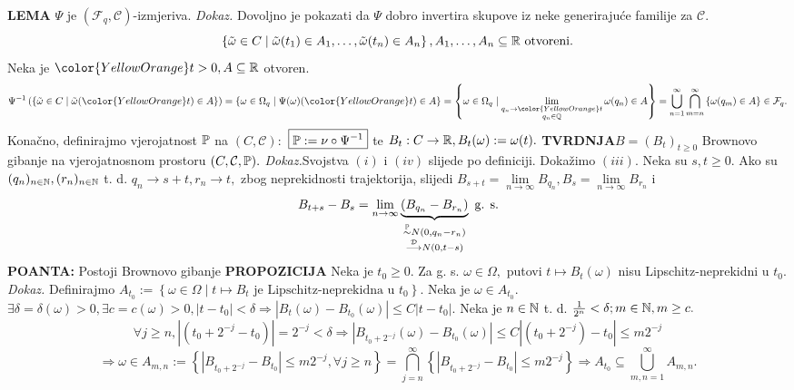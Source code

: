 \documentclass{article}
\begin{document}
\textbf{LEMA}\newline
\(\Psi\) je \((\mathcal F_q,\mathcal C)\)-izmjeriva.\newline\newline
\textit{Dokaz.}\newline
Dovoljno je pokazati da \(\Psi\) dobro invertira skupove iz neke generirajuće familije za \(\mathcal C.\) \[\left\{\tilde\omega\in C\mid\tilde\omega(t_1)\in A_1,\ldots,\tilde\omega(t_n)\in A_n\right\},A_1,\ldots,A_n\subseteq\Bbb R\text{ otvoreni}.\] Neka je \({\color{YellowOrange}t}>0,A\subseteq\Bbb R\) otvoren. \[\Psi^{-1}\left(\left\{\tilde\omega\in C\mid\tilde\omega({\color{YellowOrange}t})\in A\right\}\right)=\left\{\omega\in\Omega_q\mid \Psi(\omega)({\color{YellowOrange}t})\in A\right\}=\left\{\omega\in\Omega_q\mid\lim\limits_{\substack{q_n\to {\color{YellowOrange}t}\\q_n\in\Bbb Q}}\omega(q_n)\in A\right\}=\bigcup_{n=1}^\infty\bigcap_{m=n}^\infty\left\{\omega(q_m)\in A\right\}\in\mathcal F_q.\]
Konačno, definirajmo vjerojatnost \(\Bbb P\) na \((C,\mathcal C):\) \(\boxed{\Bbb P:=\nu\circ\Psi^{-1}}\) te \(B_t:C\to\Bbb R,B_t(\omega):=\omega(t).\)\newline 
\textbf{TVRDNJA}\newline \(B=(B_t)_{t\ge0}\) Brownovo gibanje na vjerojatnosnom prostoru \((C,\mathcal C,\Bbb P).\)\newline\newline
\textit{Dokaz.}\newline Svojstva \((i)\) i \((iv)\) slijede po definiciji. Dokažimo \((iii).\) Neka su \(s,t\ge0.\) Ako su \((q_n)_{n\in\Bbb N},(r_n)_{n\in\Bbb N}\) t. d. \(q_n\to s+t,r_n\to t,\) zbog neprekidnosti trajektorija, slijedi \(B_{s+t}=\lim\limits_{n\to\infty}B_{q_n},B_s=\lim\limits_{n\to\infty}B_{r_n}\) i \[B_{t+s}-B_s=\lim_{n\to\infty}\underbrace{(B_{q_n}-B_{r_n})}_{\substack{\overset{\Bbb P}{\sim}N\left(0,q_n-r_n\right)\\\overset{\mathcal D}{\longrightarrow}N(0,t-s)}}\text{ g. s.}\]
\textbf{POANTA:} Postoji Brownovo gibanje \newline\newline
\textbf{PROPOZICIJA}\newline
Neka je \(t_0\ge0.\) Za g. s. \(\omega\in\Omega,\) putovi \(t\mapsto B_t(\omega)\) nisu Lipschitz-neprekidni u \(t_0.\)\newline\newline
\textit{Dokaz.}\newline
Definirajmo \(A_{t_0}:=\left\{\omega\in\Omega\mid t\mapsto B_t\text{ je Lipschitz-neprekidna u }t_0\right\}.\) Neka je \(\omega\in A_{t_0}.\) \(\exists\delta=\delta(\omega)>0,\exists c=c(\omega)>0,|t-t_0|<\delta\Rightarrow\left|B_t(\omega)-B_{t_0}(\omega)\right|\le C|t-t_0|.\) Neka je \(n\in\Bbb N\) t. d. \(\frac1{2^n}<\delta;m\in\Bbb N,m\ge c.\) \[\forall j\ge n,\left|\left(t_0+2^{-j}-t_0\right)\right|=2^{-j}<\delta\Rightarrow\left|B_{t_0+2^{-j}}(\omega)-B_{t_0}(\omega)\right|\le C\left|\left(t_0+2^{-j}\right)-t_0\right|\le m2^{-j}\] \[\Rightarrow\omega\in A_{m,n}:=\left\{\left|B_{t_0+2^{-j}}-B_{t_0}\right|\le m2^{-j},\forall j\ge n\right\}=\bigcap_{j=n}^\infty\left\{\left|B_{t_0+2^{-j}}-B_{t_0}\right|\le m2^{-j}\right\}\Rightarrow A_{t_0}\subseteq\bigcup_{m,n=1}^\infty A_{m,n}.\]
\end{document}

